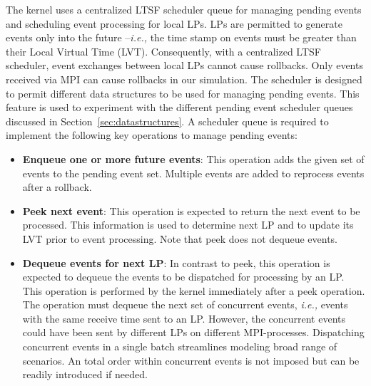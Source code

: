 The kernel uses a centralized LTSF scheduler queue for managing pending events and scheduling event processing for local LPs. LPs are permitted to generate events only into the future --\textit{i.e.,} the time stamp on events must be greater than their Local Virtual Time (LVT). Consequently, with a centralized LTSF scheduler, event exchanges between local LPs cannot cause rollbacks. Only events received via MPI can cause rollbacks in our simulation. The scheduler is designed to permit different data structures to be used for managing pending events. This feature is used to experiment with the different pending event scheduler queues discussed in Section~\ref{sec:datastructures}. A scheduler queue is required to implement the following key operations to manage pending events:
	
\begin{itemize}
\item[\ding{182}] \textbf{Enqueue one or more future events}: This operation adds the given set of events to the pending event set. Multiple events are added to reprocess events after a rollback.	 

\item[\ding{183}] \textbf{Peek next event}: This operation is expected to return the next event to be processed.  This information is used to determine next LP and to update its LVT prior to event processing. Note that peek does not dequeue events.

\item[\ding{184}] \textbf{Dequeue events for next LP}: In contrast to peek, this operation is expected to dequeue the events to be dispatched for processing by an LP. This operation is performed by the kernel immediately after a peek operation. The operation must dequeue the next set of concurrent events, \textit{i.e.,} events with the same receive time sent to an LP. However, the concurrent events could have been sent by different LPs on different MPI-processes.
Dispatching concurrent events in a single batch streamlines modeling broad range of scenarios. An total order within concurrent events is not imposed but can be readily introduced if needed.	


\end{itemize}
